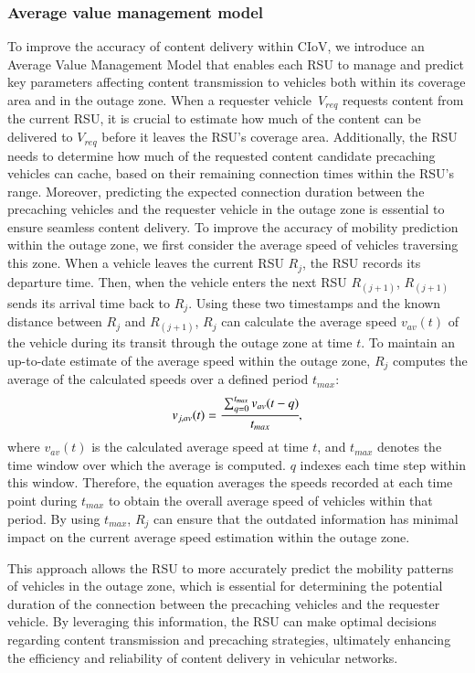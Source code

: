 \documentclass{aims}
\numberwithin{equation}{section}
\begin{document}
\subsubsection{Average value management model}
To improve the accuracy of content delivery within CIoV, we introduce an Average Value Management Model that enables each RSU to manage and predict key parameters affecting content transmission to vehicles both within its coverage area and in the outage zone.
When a requester vehicle~$V_{req}$ requests content from the current RSU, it is crucial to estimate how much of the content can be delivered to $V_{req}$ before it leaves the RSU's coverage area.
Additionally, the RSU needs to determine how much of the requested content candidate precaching vehicles can cache, based on their remaining connection times within the RSU's range.
Moreover, predicting the expected connection duration between the precaching vehicles and the requester vehicle in the outage zone is essential to ensure seamless content delivery.
To improve the accuracy of mobility prediction within the outage zone, we first consider the average speed of vehicles traversing this zone.
When a vehicle leaves the current RSU $R_{j}$, the RSU records its departure time. 
Then, when the vehicle enters the next RSU $R_{(j+1)}$, $R_{(j+1)}$ sends its arrival time back to $R_{j}$.
Using these two timestamps and the known distance between $R_{j}$ and $R_{(j+1)}$, $R_{j}$ can calculate the average speed $v_{av}(t)$ of the vehicle during its transit through the outage zone at time $t$.
To maintain an up-to-date estimate of the average speed within the outage zone, $R_{j}$ computes the average of the calculated speeds over a defined period $t_{max}$:
\begin{equation}
    v_{j, av}(t)=\cfrac{\sum^{t_{max}}_{q=0}v_{av}(t-q)}{t_{max}},
\end{equation}
where $v_{av}(t)$ is the calculated average speed at time $t$, and $t_{max}$ denotes the time window over which the average is computed.
$q$ indexes each time step within this window.
Therefore, the equation averages the speeds recorded at each time point during $t_{max}$ to obtain the overall average speed of vehicles within that period.
By using $t_{max}$, $R_{j}$ can ensure that the outdated information has minimal impact on the current average speed estimation within the outage zone.

This approach allows the RSU to more accurately predict the mobility patterns of vehicles in the outage zone, which is essential for determining the potential duration of the connection between the precaching vehicles and the requester vehicle.
By leveraging this information, the RSU can make optimal decisions regarding content transmission and precaching strategies, ultimately enhancing the efficiency and reliability of content delivery in vehicular networks.
\end{document}
